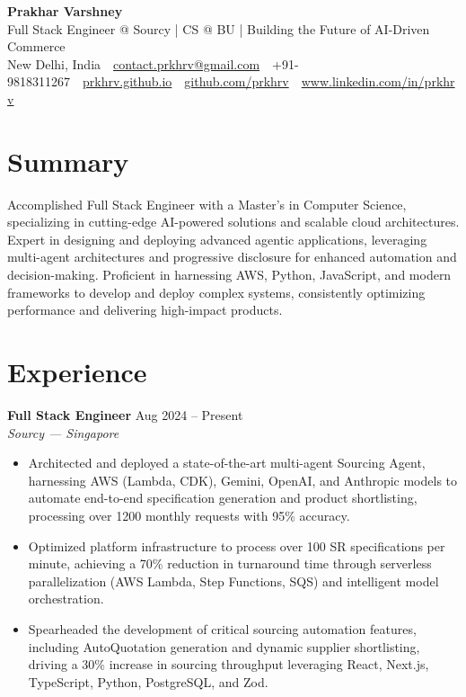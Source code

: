 \documentclass[10pt,a4paper]{article}
\newcommand{\entry}[3]{%
  \textbf{#1} \hfill {\small #3}\\
  {\itshape #2}\par
}
\begin{document}
\begin{center}
  {\Huge\bfseries\color{accent} Prakhar Varshney}\\[4pt]
  {\large Full Stack Engineer @ Sourcy | CS @ BU | Building the Future of AI-Driven Commerce}\\[6pt]
  {\small New Delhi, India\ \textbullet\ \href{mailto:contact.prkhrv@gmail.com}{contact.prkhrv@gmail.com}\ \textbullet\ +91-9818311267\ \textbullet\ \href{https://prkhrv.github.io/}{prkhrv.github.io}\ \textbullet\ \href{https://github.com/prkhrv}{github.com/prkhrv}\ \textbullet\ \href{https://www.linkedin.com/in/prkhrv/}{www.linkedin.com/in/prkhrv}}
\end{center}

\section{Summary}
Accomplished Full Stack Engineer with a Master's in Computer Science, specializing in cutting-edge AI-powered solutions and scalable cloud architectures. Expert in designing and deploying advanced agentic applications, leveraging multi-agent architectures and progressive disclosure for enhanced automation and decision-making. Proficient in harnessing AWS, Python, JavaScript, and modern frameworks to develop and deploy complex systems, consistently optimizing performance and delivering high-impact products.

\section{Experience}
\entry{Full Stack Engineer}{Sourcy --- Singapore}{Aug 2024 -- Present}
\begin{itemize}
  \item Architected and deployed a state-of-the-art multi-agent Sourcing Agent, harnessing AWS (Lambda, CDK), Gemini, OpenAI, and Anthropic models to automate end-to-end specification generation and product shortlisting, processing over 1200 monthly requests with 95\% accuracy.
  \item Optimized platform infrastructure to process over 100 SR specifications per minute, achieving a 70\% reduction in turnaround time through serverless parallelization (AWS Lambda, Step Functions, SQS) and intelligent model orchestration.
  \item Spearheaded the development of critical sourcing automation features, including AutoQuotation generation and dynamic supplier shortlisting, driving a 30\% increase in sourcing throughput leveraging React, Next.js, TypeScript, Python, PostgreSQL, and Zod.
\end{itemize}
\end{document}
